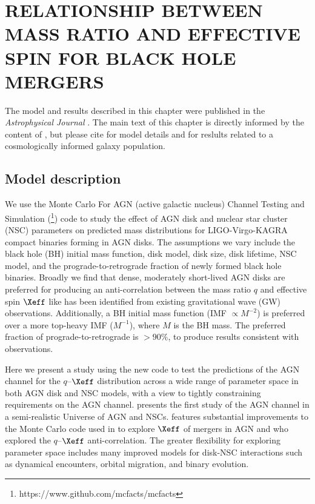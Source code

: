 \section{\texorpdfstring{\MakeUppercase{relationship between mass ratio and effective spin for black hole mergers}}{relationship between mass ratio and effective spin for black hole mergers}}
\label{sec:qXeff}


\par The model and results described in this chapter were published in the \textit{Astrophysical Journal} \citep{McKernan+25-mcfactsI,Cook+25,Delfavero+25}.
The main text of this chapter is directly informed by the content of \citet{Cook+25}, but please cite \citet{McKernan+25-mcfactsI} for model details and \citet{Delfavero+25} for reslults related to a cosmologically informed galaxy population.

\subsection{Model description}

We use the Monte Carlo For AGN (active galactic nucleus) Channel Testing and Simulation (\footnote{https://www.github.com/mcfacts/mcfacts}) code to study the effect of AGN disk and nuclear star cluster (NSC) parameters on predicted mass distributions for LIGO-Virgo-KAGRA compact binaries forming in AGN disks.
The assumptions we vary include the black hole (BH) initial mass function, disk model, disk size, disk lifetime, NSC model, and the prograde-to-retrograde fraction of newly formed black hole binaries.
Broadly we find that dense, moderately short-lived AGN disks are preferred for producing an anti-correlation between the mass ratio $q$ and effective spin $\Xeff$ like has been identified from existing gravitational wave (GW) observations.
Additionally, a BH initial mass function (IMF $\propto M^{-2}$) is preferred over a more top-heavy IMF ($M^{-1}$), where $M$ is the BH mass.
The preferred fraction of prograde-to-retrograde is $>90\%$, to produce results consistent with observations.

Here we present a study using the new  code \citep[Monte Carlo For AGN Channel Testing and Simulations:][hereafter Paper I]{McKernan+25-mcfactsI} to test the predictions of the AGN channel for the $q$--$\Xeff$ distribution across a wide range of parameter space in both AGN disk and NSC models, with a view to tightly constraining requirements on the AGN channel.
\citet{Delfavero+25} presents the first study of the AGN channel in a semi-realistic Universe of AGN and NSCs.
 features substantial improvements to the Monte Carlo code used in \citet{McKernan+20a} to explore $\Xeff$ of mergers in AGN and \citet{Mckernan+22:q-Xeff} who explored the $q$--$\Xeff$ anti-correlation.
The greater flexibility for exploring parameter space includes many improved models for disk-NSC interactions such as dynamical encounters, orbital migration, and binary evolution.


